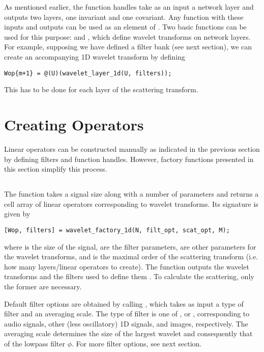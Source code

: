 \documentclass[twocolumn]{article}
\begin{document}
As mentioned earlier, the  function handles take as an input a network layer and outputs two layers, one invariant and one covariant. Any function with these inputs and outputs can be used as an element of . Two basic functions can be used for this purpose:  and , which define wavelet transforms on network layers. For example, supposing we have defined a filter bank  (see next section), we can create an accompanying 1D wavelet transform by defining
\begin{lstlisting}
Wop{m+1} = @(U)(wavelet_layer_1d(U, filters));
\end{lstlisting}
This has to be done for each layer of the scattering transform.

\section{Creating Operators}

Linear operators can be constructed manually as indicated in the previous section by defining filters and function handles. However, factory functions presented in this section simplify this process.

\subsection{}

The  function takes a signal size along with a number of parameters and returns a cell array of linear operators corresponding to wavelet transforms. Its signature is given by
\begin{lstlisting}
[Wop, filters] = wavelet_factory_1d(N, filt_opt, scat_opt, M);
\end{lstlisting}
where  is the size of the signal,  are the filter parameters,  are other parameters for the wavelet transforms, and  is the maximal order of the scattering transform (i.e. how many layers/linear operators to create). The function outputs the wavelet transforms  and the filters used to define them . To calculate the scattering, only the former are necessary.

Default filter options are obtained by calling , which takes as input a type of filter and an averaging scale. The type of filter is one of ,  or , corresponding to audio signals, other (less oscillatory) 1D signals, and images, respectively. The averaging scale determines the size of the largest wavelet and consequently that of the lowpass filter $\phi$. For more filter options, see next section.
\end{document}
